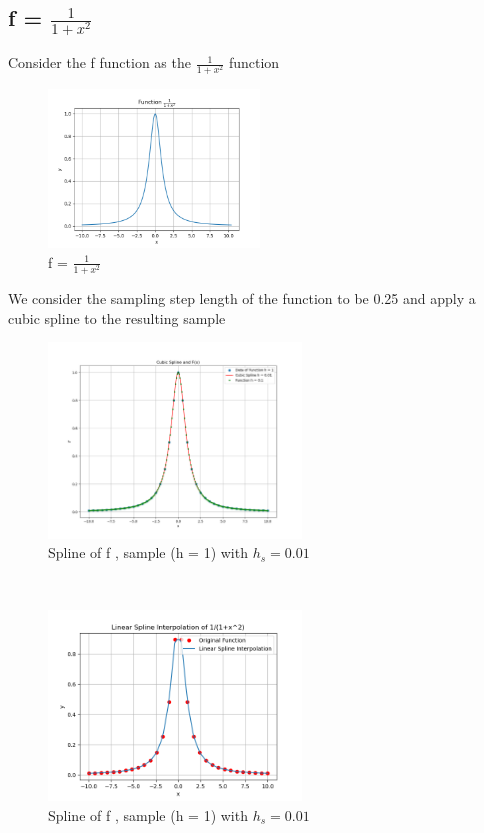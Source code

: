 \documentclass[12pt]{article}
\begin{document}
\begin{itemize}
\subsection{f = $\frac{1}{1+x^2}$}
Consider the f function as the $\frac{1}{1+x^2}$ function\\
\begin{figure}[h]
    \centering
    \includegraphics[width=0.5\textwidth]{img/gute1}
    \caption{f = $\frac{1}{1+x^2}$}
    \label{fig:mesh1}
\end{figure}
We consider the sampling step length of the function to be 0.25 and apply a cubic spline to the resulting sample \\
\begin{figure}[h]
    \centering
    \includegraphics[width=0.6\textwidth]{img/gute2}
    \caption{Spline of f , sample (h = 1) with $h_s = 0.01$ }
    \label{fig:mesh1}
\end{figure}\\

\begin{figure}[h]
    \centering
    \includegraphics[width=0.6\textwidth]{img/Spline_Linear}
    \caption{Spline of f , sample (h = 1) with $h_s = 0.01$}
    \label{fig:mesh1}
\end{figure}


\end{itemize}
\end{document}
